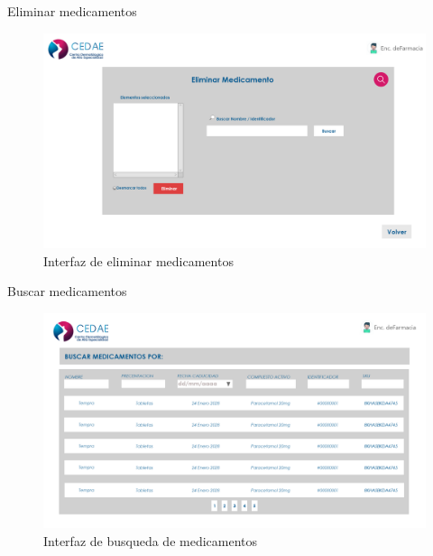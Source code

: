 \documentclass[12pt,letterpaper]{article}
\begin{document}
        Eliminar medicamentos
            \begin{figure}[H]
                \centering
                \includegraphics [scale=0.2]{far_delete_medicamento}
                \caption{Interfaz de eliminar medicamentos}
            \end{figure}
        Buscar medicamentos
            \begin{figure}[H]
                \centering
                \includegraphics [scale=0.16]{far_bus_medicamento}
                \caption{Interfaz de busqueda de medicamentos}
            \end{figure}
        
\end{document}
